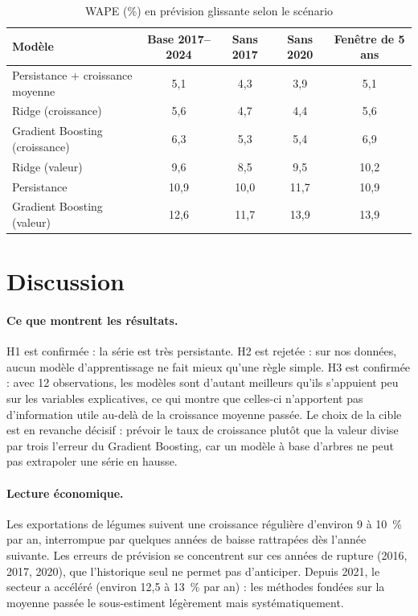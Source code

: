 \documentclass[11pt,a4paper]{article}
\begin{document}
\begin{table}[H]\centering\small
\caption{WAPE (\%) en prévision glissante selon le scénario}\label{tab:sensibilite}
\begin{tabular}{lcccc}\toprule
Modèle & Base 2017--2024 & Sans 2017 & Sans 2020 & Fenêtre de 5 ans\\\midrule
Persistance + croissance moyenne & 5,1 & 4,3 & 3,9 & 5,1\\
Ridge (croissance) & 5,6 & 4,7 & 4,4 & 5,6\\
Gradient Boosting (croissance) & 6,3 & 5,3 & 5,4 & 6,9\\
Ridge (valeur) & 9,6 & 8,5 & 9,5 & 10,2\\
Persistance & 10,9 & 10,0 & 11,7 & 10,9\\
Gradient Boosting (valeur) & 12,6 & 11,7 & 13,9 & 13,9\\
\bottomrule\end{tabular}
\end{table}

\section{Discussion}\label{sec:discussion}

\paragraph{Ce que montrent les résultats.} H1 est confirmée : la série est très persistante. H2 est rejetée : sur nos données, aucun modèle d'apprentissage ne fait mieux qu'une règle simple. H3 est confirmée : avec 12 observations, les modèles sont d'autant meilleurs qu'ils s'appuient peu sur les variables explicatives, ce qui montre que celles-ci n'apportent pas d'information utile au-delà de la croissance moyenne passée. Le choix de la cible est en revanche décisif : prévoir le taux de croissance plutôt que la valeur divise par trois l'erreur du Gradient Boosting, car un modèle à base d'arbres ne peut pas extrapoler une série en hausse.

\paragraph{Lecture économique.} Les exportations de légumes suivent une croissance régulière d'environ 9 à 10~\% par an, interrompue par quelques années de baisse rattrapées dès l'année suivante. Les erreurs de prévision se concentrent sur ces années de rupture (2016, 2017, 2020), que l'historique seul ne permet pas d'anticiper. Depuis 2021, le secteur a accéléré (environ 12,5 à 13~\% par an) : les méthodes fondées sur la moyenne passée le sous-estiment légèrement mais systématiquement.
\end{document}
